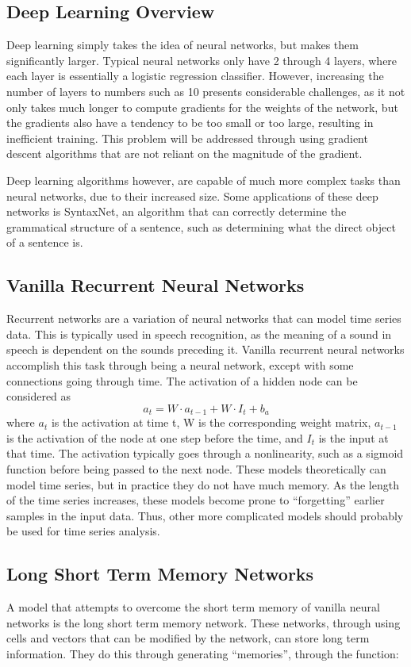 \documentclass{article}
\begin{document}
\subsection{Deep Learning Overview}
Deep learning simply takes the idea of neural networks, but makes them
significantly larger. Typical neural networks only have 2 through 4 layers,
where each layer is essentially a logistic regression classifier. However,
increasing the number of layers to numbers such as 10 presents considerable
challenges, as it not only takes much longer to compute gradients for the
weights of the network, but the gradients also have a tendency to be too small
or too large, resulting in inefficient training. This problem will be addressed
through using gradient descent algorithms that are not reliant on the magnitude
of the gradient.

Deep learning algorithms however, are capable of much more complex tasks than
neural networks, due to their increased size. Some applications of these deep
networks is SyntaxNet, an algorithm that can correctly determine the grammatical
structure of a sentence, such as determining what the direct object of a
sentence is.


\subsection{Vanilla Recurrent Neural Networks}
Recurrent networks are a variation of neural networks that can model time series
data. This is typically used in speech recognition, as the meaning of a sound in
speech is dependent on the sounds preceding it. Vanilla recurrent neural
networks accomplish this task through being a neural network, except with some
connections going through time.  The activation of a hidden node can be
considered as $$a_t = W\cdot a_{t-1} + W\cdot I_t + b_a$$ where $a_t$ is the
activation at time t, W is the corresponding weight matrix, $a_{t-1}$ is the
activation of the node at one step before the time, and $I_t$ is the input at
that time. The activation typically goes through a nonlinearity, such as a
sigmoid function before being passed to the next node. These models
theoretically can model time series, but in practice they do not have much
memory. As the length of the time series increases, these models become prone to
``forgetting'' earlier samples in the input data. Thus, other more complicated
models should probably be used for time series analysis.

\subsection{Long Short Term Memory Networks}
A model that attempts to overcome the short term memory of vanilla neural
networks is the long short term memory network. These networks, through using
cells and vectors that can be modified by the network, can store long term
information. They do this through generating ``memories'', through the function:
\end{document}
